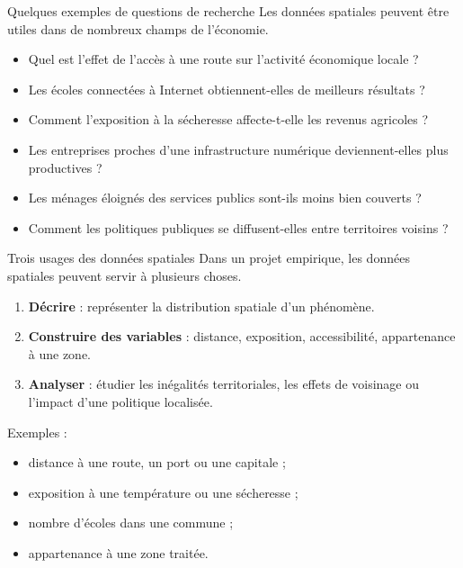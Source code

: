 \documentclass[
  10pt,
  ignorenonframetext,
]{beamer}
\begin{document}
\begin{frame}{Quelques exemples de questions de recherche}
\label{quelques-exemples-de-questions-de-recherche}
Les données spatiales peuvent être utiles dans de nombreux champs de
l'économie.

\begin{itemize}
  \item Quel est l’effet de l’accès à une route sur l’activité économique locale ?
  \item Les écoles connectées à Internet obtiennent-elles de meilleurs résultats ?
  \item Comment l’exposition à la sécheresse affecte-t-elle les revenus agricoles ?
  \item Les entreprises proches d’une infrastructure numérique deviennent-elles plus productives ?
  \item Les ménages éloignés des services publics sont-ils moins bien couverts ?
  \item Comment les politiques publiques se diffusent-elles entre territoires voisins ?
\end{itemize}
\end{frame}

\begin{frame}{Trois usages des données spatiales}
\label{trois-usages-des-donnuxe9es-spatiales}
Dans un projet empirique, les données spatiales peuvent servir à
plusieurs choses.

\begin{enumerate}
  \item \textbf{Décrire} : représenter la distribution spatiale d’un phénomène.
  \item \textbf{Construire des variables} : distance, exposition, accessibilité, appartenance à une zone.
  \item \textbf{Analyser} : étudier les inégalités territoriales, les effets de voisinage ou l’impact d’une politique localisée.
\end{enumerate}

Exemples :

\begin{itemize}
  \item distance à une route, un port ou une capitale ;
  \item exposition à une température ou une sécheresse ;
  \item nombre d’écoles dans une commune ;
  \item appartenance à une zone traitée.
\end{itemize}
\end{frame}
\end{document}
